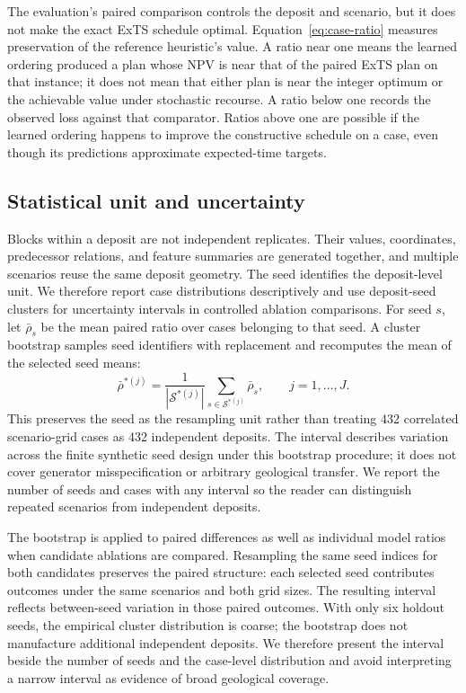 \documentclass[11pt]{article}
\begin{document}
The evaluation's paired comparison controls the deposit and scenario, but it does not make the exact ExTS schedule optimal. Equation~\ref{eq:case-ratio} measures preservation of the reference heuristic's value. A ratio near one means the learned ordering produced a plan whose NPV is near that of the paired ExTS plan on that instance; it does not mean that either plan is near the integer optimum or the achievable value under stochastic recourse. A ratio below one records the observed loss against that comparator. Ratios above one are possible if the learned ordering happens to improve the constructive schedule on a case, even though its predictions approximate expected-time targets.

\subsection{Statistical unit and uncertainty}
Blocks within a deposit are not independent replicates. Their values, coordinates, predecessor relations, and feature summaries are generated together, and multiple scenarios reuse the same deposit geometry. The seed identifies the deposit-level unit. We therefore report case distributions descriptively and use deposit-seed clusters for uncertainty intervals in controlled ablation comparisons. For seed $s$, let $\bar\rho_s$ be the mean paired ratio over cases belonging to that seed. A cluster bootstrap samples seed identifiers with replacement and recomputes the mean of the selected seed means:
\begin{equation}
\bar\rho^{*(j)}=\frac{1}{|\mathcal{S}^{*(j)}|}\sum_{s\in\mathcal{S}^{*(j)}}\bar\rho_s,
\qquad j=1,\ldots,J.
\label{eq:cluster-bootstrap}
\end{equation}
This preserves the seed as the resampling unit rather than treating 432 correlated scenario-grid cases as 432 independent deposits. The interval describes variation across the finite synthetic seed design under this bootstrap procedure; it does not cover generator misspecification or arbitrary geological transfer. We report the number of seeds and cases with any interval so the reader can distinguish repeated scenarios from independent deposits.

The bootstrap is applied to paired differences as well as individual model ratios when candidate ablations are compared. Resampling the same seed indices for both candidates preserves the paired structure: each selected seed contributes outcomes under the same scenarios and both grid sizes. The resulting interval reflects between-seed variation in those paired outcomes. With only six holdout seeds, the empirical cluster distribution is coarse; the bootstrap does not manufacture additional independent deposits. We therefore present the interval beside the number of seeds and the case-level distribution and avoid interpreting a narrow interval as evidence of broad geological coverage.
\end{document}
